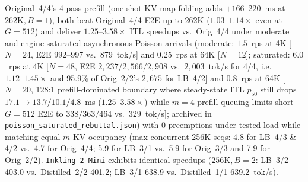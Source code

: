 \documentclass[11pt]{article}
\begin{document}
\begin{table}[t]
{Original~4/4's 4-pass prefill (one-shot KV-map folding adds $+166$--$220$~ms at $262\text{K}, B{=}1$), both beat
Original~4/4 E2E up to 262K ($1.03$--$1.14\times$ even at $G{=}512$) and deliver $1.25$--$3.58\times$ ITL speedups vs.\
Orig~4/4 under moderate and engine-saturated asynchronous Poisson arrivals (moderate: $1.5$~rps at 4K [$N{=}24$, E2E
992--997 vs.\ 879~tok/s] and $0.25$~rps at 64K [$N{=}12$]; saturated: $6.0$~rps at 4K [$N{=}48$, E2E $2{,}237 / 2{,}566 / 2{,}908$
vs.\ $2{,}003$~tok/s for 4/4, i.e.\ $1.12\text{--}1.45\times$ and 95.9\% of Orig~2/2's $2{,}675$ for LB~4/2] and $0.8$~rps at
64K [$N{=}20$, 128:1 prefill-dominated boundary where steady-state ITL $p_{50}$ still drops $17.1\to 13.7 / 10.1 / 4.8$~ms
($1.25\text{--}3.58\times$) while $m{=}4$ prefill queuing limits short-$G{=}512$ E2E to $338 / 363 / 464$ vs.\ $329$~tok/s];
archived in \texttt{poisson\_saturated\_rebuttal.json}) with 0 preemptions under tested load while matching equal-$m$ KV occupancy (max
concurrent 256K seqs: 4.8 for LB~4/3 \& 4/2 vs.\ 4.7 for Orig~4/4; 5.9 for LB~3/1 vs.\ 5.9 for Orig~3/3 and 7.9 for
Orig~2/2). \texttt{Inkling-2-Mini} exhibits identical speedups ($256\text{K}, B{=}2$: LB~3/2 403.0 vs.\ Distilled~2/2
401.2; LB~3/1 638.9 vs.\ Distilled~1/1 639.2~tok/s).}
\label{tab:vllm_speed}
\end{table}
\end{document}
